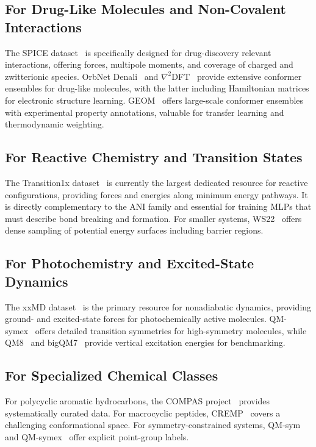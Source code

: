 \documentclass[12pt]{article}
\begin{document}
\subsection*{For Drug-Like Molecules and Non-Covalent Interactions}
The SPICE dataset~\cite{ds12-43} is specifically designed for drug-discovery relevant interactions, offering forces, multipole moments, and coverage of charged and zwitterionic species. OrbNet Denali~\cite{ds19-25} and $\nabla^2$DFT~\cite{ds31-23} provide extensive conformer ensembles for drug-like molecules, with the latter including Hamiltonian matrices for electronic structure learning. GEOM~\cite{ds34-16} offers large-scale conformer ensembles with experimental property annotations, valuable for transfer learning and thermodynamic weighting.

\subsection*{For Reactive Chemistry and Transition States}
The Transition1x dataset~\cite{ds28-47} is currently the largest dedicated resource for reactive configurations, providing forces and energies along minimum energy pathways. It is directly complementary to the ANI family and essential for training MLPs that must describe bond breaking and formation. For smaller systems, WS22~\cite{ds23-50} offers dense sampling of potential energy surfaces including barrier regions.

\subsection*{For Photochemistry and Excited-State Dynamics}
The xxMD dataset~\cite{ds21-51} is the primary resource for nonadiabatic dynamics, providing ground- and excited-state forces for photochemically active molecules. QM-symex~\cite{ds30-39} offers detailed transition symmetries for high-symmetry molecules, while QM8~\cite{ds9-35} and bigQM7~\cite{ds17-9} provide vertical excitation energies for benchmarking.

\subsection*{For Specialized Chemical Classes}
For polycyclic aromatic hydrocarbons, the COMPAS project~\cite{ds32-12} provides systematically curated data. For macrocyclic peptides, CREMP~\cite{ds33-15} covers a challenging conformational space. For symmetry-constrained systems, QM-sym~\cite{ds29-38} and QM-symex~\cite{ds30-39} offer explicit point-group labels.
\end{document}
